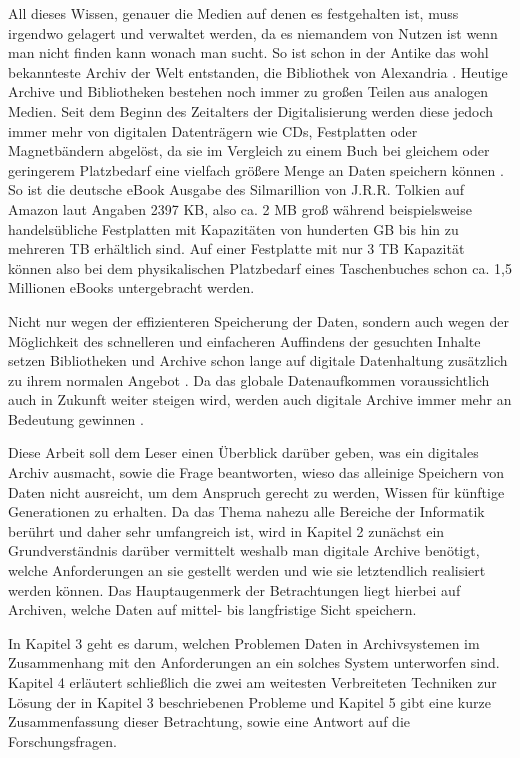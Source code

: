 \documentclass[conference,compsoc,final,a4paper]{IEEEtran}
\begin{document}
All dieses Wissen, genauer die Medien auf denen es festgehalten ist, muss irgendwo gelagert und verwaltet werden, da es niemandem von Nutzen ist wenn man nicht finden kann wonach man sucht. So ist schon in der Antike das wohl bekannteste Archiv der Welt entstanden, die Bibliothek von Alexandria \autocite{BibAlexAntike}. Heutige Archive und Bibliotheken bestehen noch immer zu großen Teilen aus analogen Medien. Seit dem Beginn des Zeitalters der Digitalisierung werden diese jedoch immer mehr von digitalen Datenträgern wie CDs, Festplatten oder Magnetbändern abgelöst, da sie im Vergleich zu einem Buch bei gleichem oder geringerem Platzbedarf eine vielfach größere Menge an Daten speichern können \autocite{KLA2015}. So ist die deutsche eBook Ausgabe des Silmarillion von J.R.R. Tolkien auf Amazon laut Angaben 2397 \ac{KB}, also ca. 2 \ac{MB} groß während beispielsweise handelsübliche Festplatten mit Kapazitäten von hunderten \ac{GB} bis hin zu mehreren \ac{TB} erhältlich sind. Auf einer Festplatte mit nur 3 \ac{TB} Kapazität können also bei dem physikalischen Platzbedarf eines Taschenbuches schon ca. 1,5 Millionen eBooks untergebracht werden.

Nicht nur wegen der effizienteren Speicherung der Daten, sondern auch wegen der Möglichkeit des schnelleren und einfacheren Auffindens der gesuchten Inhalte setzen Bibliotheken und Archive schon lange auf digitale Datenhaltung zusätzlich zu ihrem normalen Angebot \autocite{KLA2015}. Da das globale Datenaufkommen voraussichtlich auch in Zukunft weiter steigen wird, werden auch digitale Archive immer mehr an Bedeutung gewinnen \autocite{Reinsel2018}.

Diese Arbeit soll dem Leser einen Überblick darüber geben, was ein digitales Archiv ausmacht, sowie die Frage beantworten, wieso das alleinige Speichern von Daten nicht ausreicht, um dem Anspruch gerecht zu werden, Wissen für künftige Generationen zu erhalten. Da das Thema nahezu alle Bereiche der Informatik berührt und daher sehr umfangreich ist, wird in Kapitel 2 zunächst ein Grundverständnis darüber vermittelt weshalb man digitale Archive benötigt, welche Anforderungen an sie gestellt werden und wie sie letztendlich realisiert werden können. Das Hauptaugenmerk der Betrachtungen liegt hierbei auf Archiven, welche Daten auf mittel- bis langfristige Sicht speichern.

In Kapitel 3 geht es darum, welchen Problemen Daten in Archivsystemen im Zusammenhang mit den Anforderungen an ein solches System unterworfen sind. Kapitel 4 erläutert schließlich die zwei am weitesten Verbreiteten Techniken zur Lösung der in Kapitel 3 beschriebenen Probleme und Kapitel 5 gibt eine kurze Zusammenfassung dieser Betrachtung, sowie eine Antwort auf die Forschungsfragen.
\end{document}
